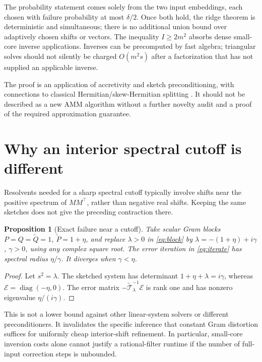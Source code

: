 \documentclass[11pt]{article}
\newtheorem{proposition}[theorem]{Proposition}
\theoremstyle{remark}
\newcommand{\diag}{\operatorname{diag}}
\begin{document}
The probability statement comes solely from the two input embeddings, each
chosen with failure probability at most \(\delta/2\). Once both hold, the
ridge theorem is deterministic and simultaneous; there is no additional union
bound over adaptively chosen shifts or vectors. The inequality
\(I\geq2m^2\) absorbs dense small-core inverse applications. Inverses can be
precomputed by fast algebra; triangular solves should not silently be charged
\(O(m^2s)\) after a factorization that has not supplied an applicable inverse.

The proof is an application of accretivity and sketch preconditioning, with
connections to classical Hermitian/skew-Hermitian splitting \cite{hss}.
It should not be described as a new AMM algorithm without a further novelty
audit and a proof of the required approximation guarantee.

\section{Why an interior spectral cutoff is different}
Resolvents needed for a sharp spectral cutoff typically involve shifts near
the positive spectrum of \(MM^\top\), rather than negative real shifts.
Keeping the same sketches does not give the preceding contraction there.

\begin{proposition}[Exact failure near a cutoff]\label{prop:shift}
Take scalar Gram blocks \(P=Q=\widetilde Q=1\),
\(\widetilde P=1+\eta\), and replace \(\lambda>0\) in
\eqref{eq:block} by
\(\lambda=-(1+\eta)+i\gamma\), \(\gamma>0\), using any complex
square root. The error iteration in \eqref{eq:iterate} has spectral radius
\(\eta/\gamma\). It diverges when \(\gamma<\eta\).
\end{proposition}
\begin{proof}
Let \(s^2=\lambda\). The sketched system has determinant
\(1+\eta+\lambda=i\gamma\), whereas
\(\mathcal E=\diag(-\eta,0)\). The error matrix
\(-\widetilde{\mathcal T}_\lambda^{-1}\mathcal E\) is rank one and has
nonzero eigenvalue \(\eta/(i\gamma)\).
\end{proof}

This is not a lower bound against other linear-system solvers or different
preconditioners. It invalidates the specific inference that constant Gram
distortion suffices for uniformly cheap interior-shift refinement. In
particular, small-core inversion costs alone cannot justify a rational-filter
runtime if the number of full-input correction steps is unbounded.
\end{document}
